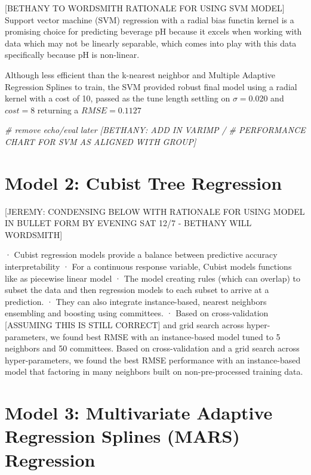 \documentclass[]{report}
\newenvironment{Shaded}{\begin{snugshade}}{\end{snugshade}}
\newcommand{\CommentTok}[1]{\textcolor[rgb]{0.56,0.35,0.01}{\textit{#1}}}
\begin{document}
{[}BETHANY TO WORDSMITH RATIONALE FOR USING SVM MODEL{]} Support vector
machine (SVM) regression with a radial bias functin kernel is a
promising choice for predicting beverage pH because it excels when
working with data which may not be linearly separable, which comes into
play with this data specifically because pH is non-linear.

Although less efficient than the k-nearest neighbor and Multiple
Adaptive Regression Splines to train, the SVM provided robust final
model using a radial kernel with a cost of 10, passed as the tune length
settling on \(\sigma = 0.020\) and \(cost = 8\) returning a
\(RMSE = 0.1127\)

\begin{Shaded}
\begin{Highlighting}[]
\CommentTok{# remove echo/eval later [BETHANY: ADD IN VARIMP /}
\CommentTok{# PERFORMANCE CHART FOR SVM AS ALIGNED WITH GROUP]}
\end{Highlighting}
\end{Shaded}

\hypertarget{model-2-cubist-tree-regression}{%
\section{Model 2: Cubist Tree
Regression}\label{model-2-cubist-tree-regression}}

{[}JEREMY: CONDENSING BELOW WITH RATIONALE FOR USING MODEL IN BULLET
FORM BY EVENING SAT 12/7 - BETHANY WILL WORDSMITH{]}

· Cubist regression models provide a balance between predictive accuracy
interpretability · For a continuous response variable, Cubist models
functions like as piecewise linear model · The model creating rules
(which can overlap) to subset the data and then regression models to
each subset to arrive at a prediction. · They can also integrate
instance-based, nearest neighbors ensembling and boosting using
committees. · Based on cross-validation {[}ASSUMING THIS IS STILL
CORRECT{]} and grid search across hyper-parameters, we found best RMSE
with an instance-based model tuned to 5 neighbors and 50 committees.
Based on cross-validation and a grid search across hyper-parameters, we
found the best RMSE performance with an instance-based model that
factoring in many neighbors built on non-pre-processed training data.

\hypertarget{model-3-multivariate-adaptive-regression-splines-mars-regression}{%
\section{Model 3: Multivariate Adaptive Regression Splines (MARS)
Regression}\label{model-3-multivariate-adaptive-regression-splines-mars-regression}}
\end{document}
